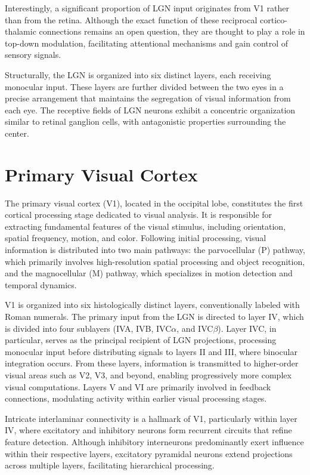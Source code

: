 Interestingly, a significant proportion of LGN input originates from V1 rather than from the retina. 
Although the exact function of these reciprocal cortico-thalamic connections remains an open question, 
they are thought to play a role in top-down modulation, facilitating attentional mechanisms
and gain control of sensory signals.

Structurally, the LGN is organized into six distinct layers, each receiving monocular input. 
These layers are further divided between the two eyes in a precise arrangement that maintains
the segregation of visual information from each eye. The receptive fields of LGN neurons exhibit a
concentric organization similar to retinal ganglion cells, with antagonistic properties surrounding the center.

\section{Primary Visual Cortex}
\label{sec:v1}
The primary visual cortex (V1), located in the occipital lobe, constitutes the first
cortical processing stage dedicated to visual analysis. It is responsible for extracting
fundamental features of the visual stimulus, including orientation, spatial frequency, 
motion, and color. Following initial processing, visual information is distributed into two main pathways: the parvocellular (P) pathway, which primarily involves
high-resolution spatial processing and object recognition, and the magnocellular (M) pathway, 
which specializes in motion detection and temporal dynamics.

V1 is organized into six histologically distinct layers, conventionally labeled with
Roman numerals. The primary input from the LGN is directed to layer IV, which is divided into four sublayers (IVA, IVB, IVC$\alpha$, and IVC$\beta$). Layer IVC, 
in particular, serves as the principal recipient of LGN projections, processing
monocular input before distributing signals to layers II and III, where binocular
integration occurs. From these layers, information is transmitted to higher-order 
visual areas such as V2, V3, and beyond, enabling progressively more complex visual
computations. Layers V and VI are primarily involved in feedback connections, 
modulating activity within earlier visual processing stages.

Intricate interlaminar connectivity is a hallmark of V1, particularly within layer IV, 
where excitatory and inhibitory neurons form recurrent circuits that refine feature
detection. Although inhibitory interneurons predominantly exert influence within their
respective layers, excitatory pyramidal neurons extend projections across multiple
layers, facilitating hierarchical processing.

